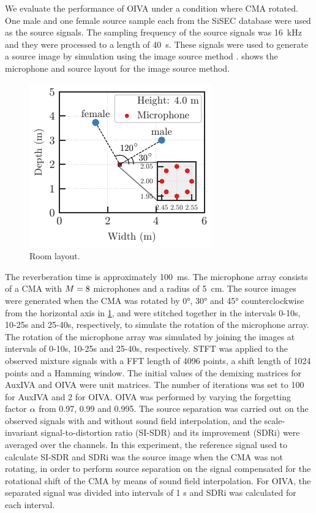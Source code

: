 \documentclass[twocolumn,9pt,dvipdfmx]{article}
\begin{document}
We evaluate the performance of OIVA under a condition where CMA rotated.
One male and one female source sample each from the SiSEC database \cite{Araki:2012:LVAICA} were used as the source signals.
The sampling frequency of the source signals was \SI{16}{\kilo\hertz} and they were processed to a length of \SI{40}{\second}.
These signals were used to generate a source image by simulation using the image source method \cite{Allen:1979:JASA}.
 shows the microphone and source layout for the image source method.
\begin{figure}[t]
  \centering
  \includegraphics{figures/room_layout.pdf}
  \caption{Room layout.}
  \label{fig:room}
\end{figure}
The reverberation time is approximately \SI{100}{\milli\second}.
The microphone array consists of a CMA with $M = 8$ microphones and a radius of \SI{5}{\centi\metre}.
The source images were generated when the CMA was rotated by 0°, 30° and 45° counterclockwise from the horizontal axis in \cref{fig:room},
and were stitched together in the intervals 0-10s, 10-25s and 25-40s, respectively, to simulate the rotation of the microphone array.
The rotation of the microphone array was simulated by joining the images at intervals of 0-10s, 10-25s and 25-40s, respectively.
%
STFT was applied to the observed mixture signals with a FFT length of 4096 points, a shift length of 1024 points and a Hamming window.
The initial values of the demixing matrices for AuxIVA and OIVA were unit matrices.
The number of iterations was set to 100 for AuxIVA and 2 for OIVA.
OIVA was performed by varying the forgetting factor $\alpha$ from \num{0.97}, \num{0.99} and \num{0.995}.
The source separation was carried out on the observed signals with and without sound field interpolation,
and the scale-invariant signal-to-distortion ratio (SI-SDR) \cite{LeRoux:2019:ICASSP} and its improvement (SDRi) were averaged over the channels.
In this experiment, the reference signal used to calculate SI-SDR and SDRi was the source image when the CMA was not rotating, in order to perform source separation on the signal compensated for the rotational shift of the CMA by means of sound field interpolation.
For OIVA, the separated signal was divided into intervals of 1 s and SDRi was calculated for each interval.
\end{document}
